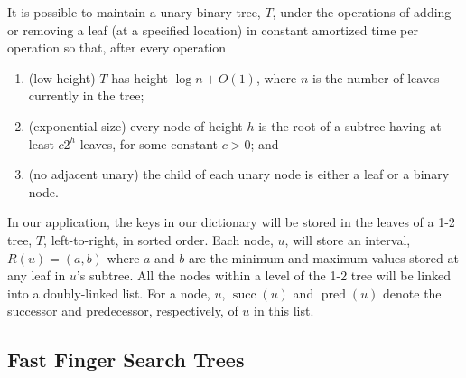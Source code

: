 \documentclass{patmorin}
\DeclareMathOperator{\scc}{succ}
\DeclareMathOperator{\pred}{pred}
\begin{document}
\begin{thm}[Fagerberg]
  It is possible to maintain a unary-binary tree, $T$, under the operations
  of adding or removing a leaf (at a specified location) in constant
  amortized time per operation so that, after every operation
  \begin{enumerate}
    \item(low height) $T$ has height $\log n + O(1)$, where $n$ is the
      number of leaves currently in the tree;
    \item(exponential size) every node of height $h$ is the root of a
      subtree having at least $c2^h$ leaves, for some constant $c>0$; and
    \item(no adjacent unary) the child of each unary node is either 
      a leaf or a binary node.
   \end{enumerate}
\end{thm}

In our application, the keys in our dictionary will be stored in the
leaves of a 1-2 tree, $T$, left-to-right, in sorted order.  Each node,
$u$, will store an interval, $R(u)=(a,b)$ where $a$ and $b$ are the
minimum and maximum values stored at any leaf in $u$'s subtree.  All the
nodes within a level of the 1-2 tree will be linked into a doubly-linked
list.  For a node, $u$, $\scc(u)$ and $\pred(u)$ denote the successor
and predecessor, respectively, of $u$ in this list.

\subsection{Fast Finger Search Trees}

%
%
%
%
\end{document}
